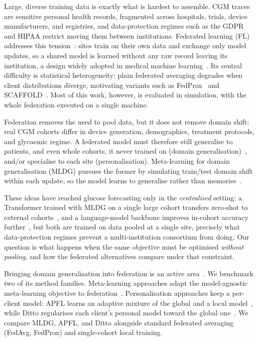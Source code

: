 \documentclass[10pt,letterpaper]{article}
\begin{document}
Large, diverse training data is exactly what is hardest to assemble. CGM
traces are sensitive personal health records, fragmented across hospitals,
trials, device manufacturers, and registries, and data-protection regimes
such as the GDPR and HIPAA restrict moving them between institutions.
Federated learning (FL) addresses this tension~\cite{mcmahan2017fedavg}:
sites train on their own data and exchange only model updates, so a shared
model is learned without any raw record leaving its institution, a
design widely adopted in medical machine
learning~\cite{rieke2020future,sheller2020federated,kaissis2020secure}. Its
central difficulty is statistical heterogeneity: plain federated averaging
degrades when client distributions diverge, motivating variants such as
FedProx~\cite{li2020fedprox} and SCAFFOLD~\cite{karimireddy2020scaffold}.
Most of this work, however, is evaluated in simulation, with the whole
federation executed on a single machine.

Federation removes the need to pool data, but it does not remove domain
shift: real CGM cohorts differ in device generation, demographics,
treatment protocols, and glycaemic regime. A federated model must therefore
still generalise to patients, and even whole cohorts, it never trained on
(domain generalisation)~\cite{zhou2022dgsurvey}, and/or specialise to each
site (personalisation). Meta-learning for domain generalisation (MLDG)
pursues the former by simulating train/test domain shift within each
update, so the model learns to generalise rather than
memorise~\cite{li2018mldg}.

These ideas have reached glucose forecasting only in the \emph{centralised}
setting: a Transformer trained with MLDG on a single large cohort transfers
zero-shot to external cohorts~\cite{zhu2024gpformer}, and a language-model
backbone improves in-cohort accuracy further~\cite{zhu2026glullm}, but both
are trained on data pooled at a single site, precisely what
data-protection regimes prevent a multi-institution consortium from doing.
Our question is what happens when the same objective must be optimised
\emph{without pooling}, and how the federated alternatives compare under
that constraint.

Bringing domain generalisation into federation is an active
area~\cite{li2025fedDGsurvey}. We benchmark two of its method families.
Meta-learning approaches adapt the model-agnostic meta-learning objective
to federation~\cite{chen2018fedmeta,fallah2020perfedavg}. Personalisation
approaches keep a per-client model: APFL learns an adaptive mixture of the
global and a local model~\cite{deng2020apfl}, while Ditto regularises each
client's personal model toward the global one~\cite{li2021ditto}. We
compare MLDG, APFL, and Ditto alongside standard federated averaging
(FedAvg, FedProx) and single-cohort local training.
\end{document}
